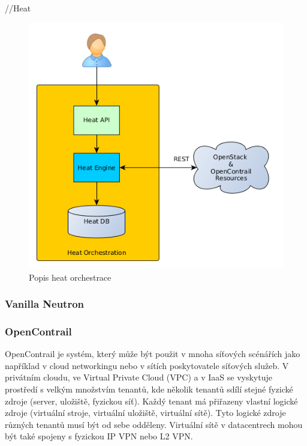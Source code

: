 //Heat


\begin{figure}[h]
\begin{centering}
\includegraphics[scale=0.41]{images/heat_engine}
\par\end{centering}
\caption{Popis heat orchestrace\label{fig:heat_engine}}
\end{figure}


\subsubsection{Vanilla Neutron}

\subsubsection{OpenContrail} 

OpenContrail je systém, který může být použit v mnoha síťových scénářích jako například v cloud networkingu nebo v sítích poskytovatele síťových služeb. V privátním cloudu, ve Virtual Private Cloud (VPC) a v IaaS se vyskytuje prostředí s velkým množstvím tenantů, kde několik tenantů sdílí stejné fyzické zdroje (server, uložiště, fyzickou síť). Každý tenant má přiřazeny vlastní logické zdroje (virtuální stroje, virtuální uložiště, virtuální sítě). Tyto logické zdroje různých tenantů musí být od sebe odděleny. Virtuální sítě v datacentrech mohou být také spojeny s fyzickou IP VPN nebo L2 VPN. \cite{OpenContrail}

